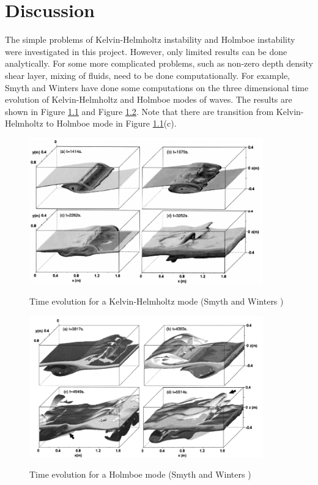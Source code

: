 \chapter{Discussion}
The simple problems of Kelvin-Helmholtz instability and Holmboe
instability were investigated in this project. However, only limited
results can be done analytically. For some more complicated
problems, such as non-zero depth density shear layer, mixing of
fluids, need to be done computationally. For example, Smyth and
Winters \cite{Smyth} have done some computations on the three
dimensional time evolution of Kelvin-Helmholtz and Holmboe modes of
waves. The results are shown in Figure \ref{kh3} and Figure
\ref{ho5}. Note that there are transition from Kelvin-Helmholtz to
Holmboe mode in Figure \ref{kh3}(c).
\begin{figure}[htpb]
  \centering
  \includegraphics[width=0.9\textwidth]{kh3.png}\\
  \caption{Time evolution for a Kelvin-Helmholtz mode (Smyth and Winters \cite{Smyth})}\label{kh3}
\end{figure}
\begin{figure}[htpb]
  \centering
  \includegraphics[width=0.9\textwidth]{ho5.png}\\
  \caption{Time evolution for a Holmboe mode (Smyth and Winters \cite{Smyth})}\label{ho5}
\end{figure}
